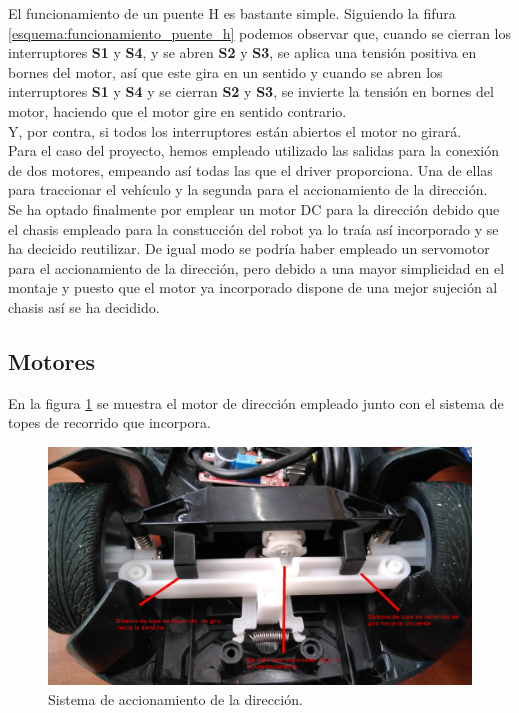 El funcionamiento de un puente H es  bastante  simple. Siguiendo la fifura \ref{esquema:funcionamiento_puente_h} podemos observar que, cuando se cierran los interruptores \textbf{S1} y \textbf{S4}, y se abren \textbf{S2} y \textbf{S3}, se aplica una tensión positiva en bornes del motor, así 
que este gira en un sentido y cuando se abren los interruptores \textbf{S1} y \textbf{S4} y se cierran \textbf{S2} y \textbf{S3}, se invierte la tensión en bornes del motor, haciendo que el motor gire en sentido contrario.\\

Y, por contra, si todos los interruptores están abiertos el motor no girará. \\

Para el caso del proyecto, hemos empleado utilizado las salidas para la conexión de dos motores, empeando así todas las que el driver proporciona. Una de ellas para traccionar
el vehículo y la segunda para el accionamiento de la dirección.\\

Se ha optado finalmente por emplear un motor DC para la dirección debido que el chasis empleado para la constucción del robot ya lo traía así incorporado y se ha decicido reutilizar.
De igual modo se podría haber empleado un servomotor para el accionamiento de la dirección, pero debido a una mayor simplicidad en el montaje y puesto que el motor ya incorporado
dispone de una mejor sujeción al chasis así se ha decidido.\\

\subsection{Motores}

En la figura \ref{img:sistema_direccion} se muestra el motor de dirección empleado junto con el sistema de topes de recorrido que incorpora.\\


\begin{figure}[H]
  \begin{center}
    \includegraphics[scale=0.2]{imagenes/robot/motor-direccion.jpg}
  \end{center}
  \caption{Sistema de accionamiento de la dirección.}
  \label{img:sistema_direccion}
\end{figure}

